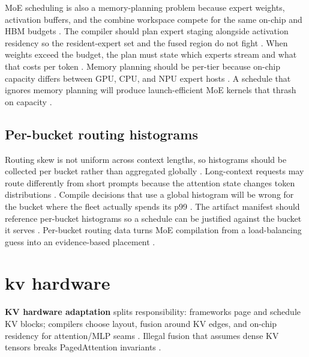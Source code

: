MoE scheduling is also a memory-planning problem because expert weights, activation buffers, and the combine workspace compete for the same on-chip and HBM budgets \citep{liu2024deepseekv3,memoryfloor2026,patel2025llminference}. The compiler should plan expert staging alongside activation residency so the resident-expert set and the fused region do not fight \citep{chen2020compilerbasedhardw,semianalysis2024tma}. When weights exceed the budget, the plan must state which experts stream and what that costs per token \citep{memoryfloor2026,taxbreak2026}. Memory planning should be per-tier because on-chip capacity differs between GPU, CPU, and NPU expert hosts \citep{amd2024xdna,amd2024aie,dlbook}. A schedule that ignores memory planning will produce launch-efficient MoE kernels that thrash on capacity \citep{liu2024deepseekv3,memoryfloor2026}.

\subsection{Per-bucket routing histograms}

Routing skew is not uniform across context lengths, so histograms should be collected per bucket rather than aggregated globally \citep{liu2024deepseekv3,patel2025llminference,memoryfloor2026}. Long-context requests may route differently from short prompts because the attention state changes token distributions \citep{patel2025llminference,taxbreak2026}. Compile decisions that use a global histogram will be wrong for the bucket where the fleet actually spends its p99 \citep{memoryfloor2026,chen2020compilerbasedhardw}. The artifact manifest should reference per-bucket histograms so a schedule can be justified against the bucket it serves \citep{liu2024deepseekv3,patel2025llminference}. Per-bucket routing data turns MoE compilation from a load-balancing guess into an evidence-based placement \citep{memoryfloor2026,taxbreak2026}.

\section{kv hardware}
\label{sec:ch23_kv_hardware}

\textbf{KV hardware adaptation} splits responsibility: frameworks page and schedule KV blocks; compilers choose layout, fusion around KV edges, and on-chip residency for attention/MLP seams \citep{kwon2023vllm,dao2022flashattention,dao2023flashdecoding,yirage2026,chen2020compilerbasedhardw,patel2025llminference,memoryfloor2026,taxbreak2026,liu2024deepseekv3,amd2024xdna,amd2024aie,dlbook,semianalysis2024tma,nvidia2024cudagraphs,nvidia2022hopper}. Illegal fusion that assumes dense KV tensors breaks PagedAttention invariants \citep{kwon2023vllm,patel2025llminference,yirage2026,chen2020compilerbasedhardw,memoryfloor2026,taxbreak2026,liu2024deepseekv3,amd2024aie,dlbook,dao2022flashattention,dao2023flashdecoding,nvidia2024cudagraphs,nvidia2022hopper,semianalysis2024tma,amd2024xdna}.

